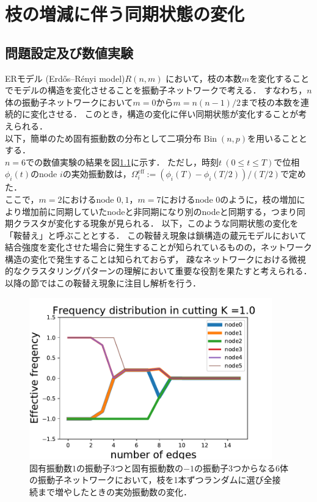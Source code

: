 \documentclass[../main]{subfiles}
\begin{document}
\chapter{枝の増減に伴う同期状態の変化}
\label{chap:method-3body}
\section{問題設定及び数値実験}
\label{sec:method-3body-settting}
ERモデル (Erdős–Rényi model)$R(n,m)$ において，枝の本数$m$を変化することでモデルの構造を変化させることを振動子ネットワークで考える．
すなわち，$n$ 体の振動子ネットワークにおいて$m=0$から$m=n(n-1)/2$まで枝の本数を連続的に変化させる．
このとき，構造の変化に伴い同期状態が変化することが考えられる．\\
以下，簡単のため固有振動数の分布として二項分布$\operatorname{Bin}(n,p)$を用いることとする．\\
$n=6$での数値実験の結果を図\ref{fig:cutting_N6K1}に示す．
ただし，時刻$t\ (0\leq t\leq T)$で位相$\phi_i(t)$のnode $i$の実効振動数は，$\Omega_i^{\mathrm{eff}}:=(\phi_i(T)-\phi_i(T/2))/(T/2)$で定めた．\\
ここで，$m=2$におけるnode $0,1$，$m=7$におけるnode $0$のように，枝の増加により増加前に同期していたnodeと非同期になり別のnodeと同期する，つまり同期クラスタが変化する現象が見られる．
以下，このような同期状態の変化を「鞍替え」と呼ぶこととする．
この鞍替え現象は鎖構造の蔵元モデルにおいて結合強度を変化させた場合に発生することが知られている\cite{XiaHuang:130506}ものの，ネットワーク構造の変化で発生することは知られておらず，
疎なネットワークにおける微視的なクラスタリングパターンの理解において重要な役割を果たすと考えられる．
以降の節ではこの鞍替え現象に注目し解析を行う．
\begin{figure}[t]
\centering
\includegraphics[width=105mm]{./images/cutting_N6K1.pdf}
\centering
\caption{固有振動数$1$の振動子3つと固有振動数の$-1$の振動子3つからなる6体の振動子ネットワークにおいて，枝を1本ずつランダムに選び全接続まで増やしたときの実効振動数の変化．}
\label{fig:cutting_N6K1}
\end{figure}
\end{document}
